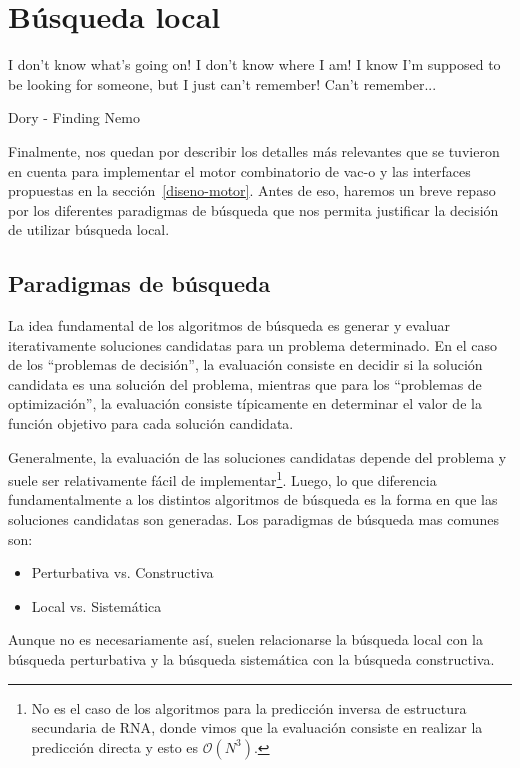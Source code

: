\chapter{B\'usqueda local}
\label{busqueda}
\epigraph{I don't know what's going on! I don't know where I am! I know I'm
supposed to be looking for someone, but I just can't remember! Can't
remember...}%
{Dory - Finding Nemo}

Finalmente, nos quedan por describir los detalles m\'as relevantes que se
tuvieron en cuenta para implementar el motor combinatorio de \ac{vac-o} y las
interfaces propuestas en la secci\'on~\ref{diseno-motor}. Antes de eso, haremos
un breve repaso por los diferentes paradigmas de b\'usqueda que nos permita
justificar la decisi\'on de utilizar b\'usqueda local.

\section{Paradigmas de b\'usqueda}

La idea fundamental de los algoritmos de b\'usqueda es generar y evaluar
iterativamente soluciones candidatas para un problema determinado. En el caso de
los ``problemas de decisi\'on'', la evaluaci\'on consiste en decidir si la
soluci\'on candidata es una soluci\'on del problema, mientras que para los
``problemas de optimizaci\'on'', la evaluaci\'on consiste t\'ipicamente en
determinar el valor de la funci\'on objetivo para cada soluci\'on candidata.

Generalmente, la evaluaci\'on de las soluciones candidatas depende del problema
y suele ser relativamente f\'acil de implementar\footnote{No es el caso de los
algoritmos para la predicci\'on inversa de estructura secundaria de \ac{RNA},
donde vimos que la evaluaci\'on consiste en realizar la predicci\'on directa y
esto es $\mathcal{O}(N^{3})$.}. Luego, lo que diferencia fundamentalmente a los
distintos algoritmos de b\'usqueda es la forma en que las soluciones candidatas
son generadas. Los paradigmas de b\'usqueda mas comunes son:
\begin{itemize}
 \item Perturbativa vs. Constructiva
 \item Local vs. Sistem\'atica
\end{itemize}

Aunque no es necesariamente as\'i, suelen relacionarse la b\'usqueda local con
la b\'usqueda perturbativa y la b\'usqueda sistem\'atica con la b\'usqueda
constructiva.

